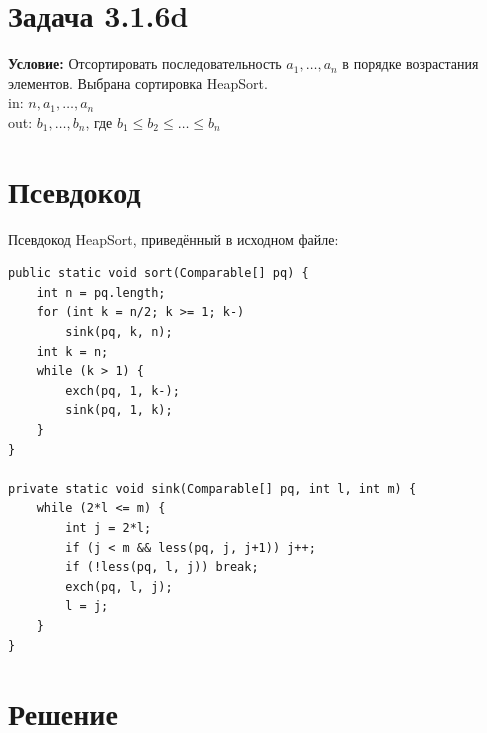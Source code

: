 \documentclass[12pt]{article}
\begin{document}
\tableofcontents

\section{Задача 3.1.6d}

\textbf{Условие:} Отсортировать последовательность $a_1,\ldots,a_n$ в порядке возрастания элементов. Выбрана сортировка HeapSort.
\\
in: $n,a_1,\ldots,a_n$\\
out: $b_1,\ldots,b_n$, где $b_1\leq b_2\leq\ldots\leq b_n$

\section{Псевдокод}

Псевдокод HeapSort, приведённый в исходном файле:
\begin{verbatim}
public static void sort(Comparable[] pq) {
    int n = pq.length;
    for (int k = n/2; k >= 1; k-)
        sink(pq, k, n);
    int k = n;
    while (k > 1) {
        exch(pq, 1, k-);
        sink(pq, 1, k);
    }
}

private static void sink(Comparable[] pq, int l, int m) {
    while (2*l <= m) {
        int j = 2*l;
        if (j < m && less(pq, j, j+1)) j++;
        if (!less(pq, l, j)) break;
        exch(pq, l, j);
        l = j;
    }
}
\end{verbatim}

\section{Решение}
\end{document}
